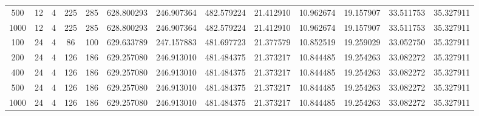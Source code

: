 \begin{table}[h]
\begin{tabular}{ccccccccccccc}
500 & 12 & 4 & 225 & 285 & 628.800293 & 246.907364 & 482.579224 & 21.412910 & 10.962674 & 19.157907 & 33.511753 & 35.327911 \\
1000 & 12 & 4 & 225 & 285 & 628.800293 & 246.907364 & 482.579224 & 21.412910 & 10.962674 & 19.157907 & 33.511753 & 35.327911 \\
100 & 24 & 4 & 86 & 100 & 629.633789 & 247.157883 & 481.697723 & 21.377579 & 10.852519 & 19.259029 & 33.052750 & 35.327911 \\
200 & 24 & 4 & 126 & 186 & 629.257080 & 246.913010 & 481.484375 & 21.373217 & 10.844485 & 19.254263 & 33.082272 & 35.327911 \\
400 & 24 & 4 & 126 & 186 & 629.257080 & 246.913010 & 481.484375 & 21.373217 & 10.844485 & 19.254263 & 33.082272 & 35.327911 \\
500 & 24 & 4 & 126 & 186 & 629.257080 & 246.913010 & 481.484375 & 21.373217 & 10.844485 & 19.254263 & 33.082272 & 35.327911 \\
1000 & 24 & 4 & 126 & 186 & 629.257080 & 246.913010 & 481.484375 & 21.373217 & 10.844485 & 19.254263 & 33.082272 & 35.327911 \\
\bottomrule
\end{tabular}
\end{table}
